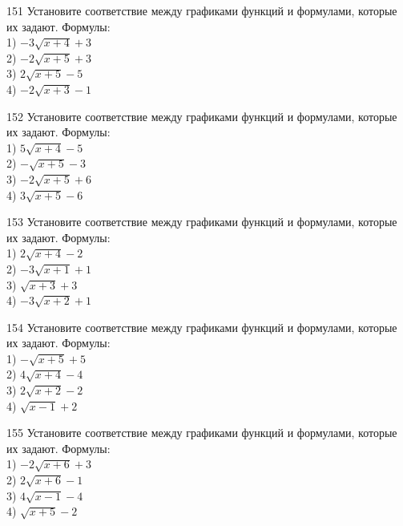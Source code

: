 \documentclass[4apaper]{article}
\begin{document}
\begin{taskBN}{151}
Установите соответствие между графиками функций и формулами, которые их задают. Формулы: \\1) $-3\sqrt{x+4}+3$\\2) $-2\sqrt{x+5}+3$\\3) $2\sqrt{x+5}-5$\\4) $-2\sqrt{x+3}-1$
\end{taskBN}

\begin{taskBN}{152}
Установите соответствие между графиками функций и формулами, которые их задают. Формулы: \\1) $5\sqrt{x+4}-5$\\2) $-\sqrt{x+5}-3$\\3) $-2\sqrt{x+5}+6$\\4) $3\sqrt{x+5}-6$
\end{taskBN}

\begin{taskBN}{153}
Установите соответствие между графиками функций и формулами, которые их задают. Формулы: \\1) $2\sqrt{x+4}-2$\\2) $-3\sqrt{x+1}+1$\\3) $\sqrt{x+3}+3$\\4) $-3\sqrt{x+2}+1$
\end{taskBN}

\begin{taskBN}{154}
Установите соответствие между графиками функций и формулами, которые их задают. Формулы: \\1) $-\sqrt{x+5}+5$\\2) $4\sqrt{x+4}-4$\\3) $2\sqrt{x+2}-2$\\4) $\sqrt{x-1}+2$
\end{taskBN}

\begin{taskBN}{155}
Установите соответствие между графиками функций и формулами, которые их задают. Формулы: \\1) $-2\sqrt{x+6}+3$\\2) $2\sqrt{x+6}-1$\\3) $4\sqrt{x-1}-4$\\4) $\sqrt{x+5}-2$
\end{taskBN}
\end{document}
